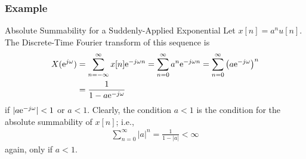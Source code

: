 \documentclass[mathserif,9pt]{beamer}
\begin{document}
\begin{frame}\frametitle{Example}\small
   
   \begin{alertblock}{Absolute Summability for a Suddenly-Applied Exponential}
   Let $x[n] = a^n u[n]$. The Discrete-Time Fourier transform of this sequence is  
   \begin{align}
     X({\textrm{e}}^{j\omega}) &= \sum_{n=-\infty}^{\infty} x[n] {\textrm{e}}^{-j\omega n}
     = \sum_{n=0}^{\infty} a^n {\textrm{e}}^{-j\omega n}
     = \sum_{n=0}^{\infty} \left(a {\textrm{e}}^{-j\omega}\right)^n
     \nonumber \\
     &= \frac{1}{1 - a {\textrm{e}}^{-j\omega}} \nonumber
   \end{align}
   if $|a {\textrm{e}}^{-j\omega}| < 1$ or $a < 1$. Clearly, the condition $a<1$ is the condition for the absolute summability of $x[n]$; i.e.,
   \begin{align}
      \sum_{n=0}^{\infty} |a|^n = \frac{1}{1-|a|} < \infty
     \nonumber
   \end{align} 
   again, only if $a < 1$. 
   \end{alertblock}
   
\end{frame}
\end{document}
